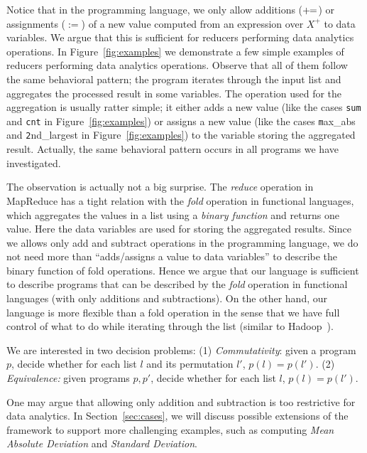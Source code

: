 Notice that in the programming language, we only allow additions ($+\!\!=$) or assignments ($:=$) of a new value computed from an expression over $X^+$ to data variables. 
We argue that this is sufficient for reducers performing data analytics operations.
In Figure~\ref{fig:examples} we demonstrate a few simple examples of reducers performing data analytics operations. Observe that all of them follow the same behavioral pattern; the program iterates through the input list and aggregates the processed result in some variables. The operation used for the aggregation is usually ratter simple; it either adds a new value (like the cases \texttt{sum} and \texttt{cnt} in Figure~\ref{fig:examples}) or assigns a new value (like the cases {\texttt max\_abs} and {\texttt 2nd\_largest} in Figure~\ref{fig:examples}) to the variable storing the aggregated result. Actually, the same behavioral pattern occurs in all programs we have investigated.




The observation is actually not a big surprise. The \emph{reduce} operation in MapReduce has a tight relation with the \emph{fold} operation in functional languages, which aggregates the values in a list using a \emph{binary function} and returns one value. Here the data variables are used for storing the aggregated results. Since we allows only add and subtract operations in the programming language, we do not need more than ``adds/assigns a value to data variables'' to describe the binary function of fold operations. Hence we argue that our language is sufficient to describe programs that can be described by the \emph{fold} operation in functional languages (with only additions and subtractions). On the other hand, our language is more flexible than a fold operation in the sense that we have full control of what to do while iterating through the list (similar to Hadoop~\cite{Hadoop}).
 
We are interested in two decision problems: (1) \emph{Commutativity}: given a program $p$, decide whether for each list $l$ and its permutation $l'$, $p(l) = p(l')$. (2) \emph{Equivalence:} given programs $p,p'$, decide whether for each list $l$, $p(l)=p(l')$.

One may argue that allowing only addition and subtraction is too restrictive for data analytics. 
In Section~\ref{sec:cases}, we will discuss possible extensions of the framework to support more challenging examples, such as computing \emph{Mean Absolute Deviation} and \emph{Standard Deviation}.



